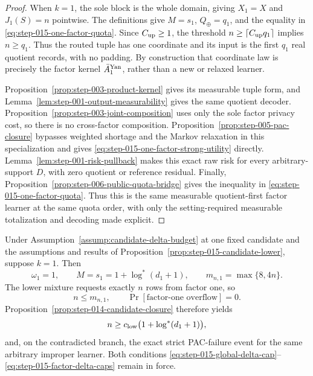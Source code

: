 \begin{proof}
When \(k=1\), the sole block is the whole domain, giving
\(X_1=X\) and \(J_1(S)=n\) pointwise.  The definitions give
\(M=s_1\), \(Q_\oplus=q_1\), and the equality in
\eqref{eq:step-015-one-factor-quota}.  Since \(C_{\rm up}\ge1\), the
threshold \(n\ge\lceil C_{\rm up}q_1\rceil\) implies \(n\ge q_1\).
Thus the routed tuple has one coordinate and its input is the first
\(q_1\) real quotient records, with no padding.  By construction that
coordinate law is precisely the factor kernel
\(\bar A_1^{\rm Yan}\), rather than a new or relaxed learner.

Proposition~\ref{prop:step-003-product-kernel} gives its measurable
tuple form, and Lemma~\ref{lem:step-001-output-measurability} gives the
same quotient decoder.
Proposition~\ref{prop:step-003-joint-composition} uses only the sole
factor privacy cost, so there is no cross-factor composition.
Proposition~\ref{prop:step-005-pac-closure} bypasses weighted shortage
and the Markov relaxation in this specialization and gives
\eqref{eq:step-015-one-factor-strong-utility} directly.
Lemma~\ref{lem:step-001-risk-pullback} makes this exact raw risk for
every arbitrary-support \(D\), with zero quotient or reference
residual.  Finally,
Proposition~\ref{prop:step-006-public-quota-bridge} gives the inequality
in \eqref{eq:step-015-one-factor-quota}.  Thus this is the same
measurable quotient-first factor learner at the same quota order, with
only the setting-required measurable totalization and decoding made
explicit.
\end{proof}

\begin{proposition}
\label{prop:step-015-one-factor-lower}
Under Assumption~\ref{assump:candidate-delta-budget} at one fixed
candidate and the assumptions and results of
Proposition~\ref{prop:step-015-candidate-lower}, suppose \(k=1\).  Then
\begin{equation}\label{eq:step-015-one-factor-lower-identities}
\omega_1=1,
\qquad
M=s_1=1+\log^*(d_1+1),
\qquad
m_{n,1}=\max\{8,4n\}.
\end{equation}
The lower mixture requests exactly \(n\) rows from factor one, so
\begin{equation}\label{eq:step-015-one-factor-zero-overflow}
n\le m_{n,1},
\qquad
\Pr[\text{factor-one overflow}]=0.
\end{equation}
Proposition~\ref{prop:step-014-candidate-closure} therefore yields
\begin{equation}\label{eq:step-015-one-factor-lower-rate}
n\ge c_{\rm low}\bigl(1+\log^*(d_1+1)\bigr),
\end{equation}
and, on the contradicted branch, the exact strict PAC-failure event for
the same arbitrary improper learner.  Both conditions
\eqref{eq:step-015-global-delta-cap}--%
\eqref{eq:step-015-factor-delta-caps} remain in force.
\end{proposition}

